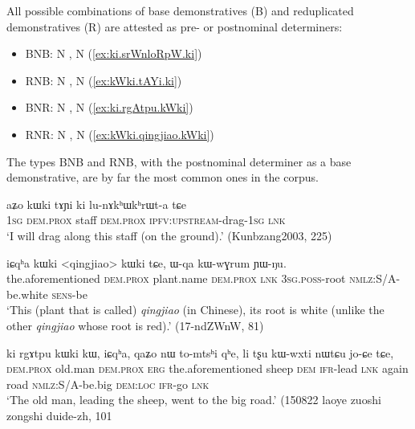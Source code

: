 All possible combinations of base demonstratives (B) and reduplicated demonstratives (R) are attested as pre- or postnominal determiners:

\begin{itemize}
\item BNB:  N ,  N  (\ref{ex:ki.srWnloRpW.ki})
\item RNB:  N ,  N  (\ref{ex:kWki.tAYi.ki})
\item BNR:  N ,  N  (\ref{ex:ki.rgAtpu.kWki})
\item RNR:  N ,  N  (\ref{ex:kWki.qingjiao.kWki})
\end{itemize}  

The types BNB and RNB, with the postnominal determiner as a base demonstrative, are by far the most common ones in the corpus.

\begin{exe}
\ex \label{ex:kWki.tAYi.ki}
 \gll  aʑo kɯki tɤɲi ki lu-nɤkʰɯkʰrɯt-a tɕe \\
 \textsc{1sg} \textsc{dem}.\textsc{prox} staff \textsc{dem}.\textsc{prox} \textsc{ipfv}:\textsc{upstream}-drag-\textsc{1sg} \textsc{lnk} \\
 \glt `I will drag along this staff (on the ground).' (Kunbzang2003, 225)
\end{exe}
 

\begin{exe}
\ex \label{ex:kWki.qingjiao.kWki}
 \gll iɕqʰa kɯki <qingjiao> kɯki tɕe, ɯ-qa kɯ-wɣrum ɲɯ-ŋu. \\
 the.aforementioned \textsc{dem}.\textsc{prox} plant.name \textsc{dem}.\textsc{prox} \textsc{lnk} \textsc{3sg}.\textsc{poss}-root \textsc{nmlz}:S/A-be.white \textsc{sens}-be \\
 \glt `This (plant that is called) \textit{qingjiao} (in Chinese), its root is white (unlike the other \textit{qingjiao} whose root is red).' (17-ndZWnW, 81)
\end{exe}

\begin{exe}
\ex \label{ex:ki.rgAtpu.kWki}
 \gll ki rgɤtpu kɯki kɯ, iɕqʰa, qaʑo nɯ to-mtsʰi qʰe, li tʂu kɯ-wxti nɯtɕu jo-ɕe tɕe, \\
\textsc{dem}.\textsc{prox} old.man \textsc{dem}.\textsc{prox} \textsc{erg} the.aforementioned sheep \textsc{dem} \textsc{ifr}-lead \textsc{lnk} again road \textsc{nmlz}:S/A-be.big \textsc{dem}:\textsc{loc} \textsc{ifr}-go \textsc{lnk} \\
\glt `The old man, leading the sheep, went to the big road.' (150822 laoye zuoshi zongshi duide-zh, 101
\end{exe}

